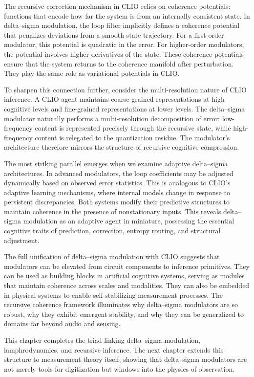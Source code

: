 The recursive correction mechanism in CLIO relies on coherence potentials: functions that encode how far the system is from an internally consistent state. In delta–sigma modulation, the loop filter implicitly defines a coherence potential that penalizes deviations from a smooth state trajectory. For a first-order modulator, this potential is quadratic in the error. For higher-order modulators, the potential involves higher derivatives of the state. These coherence potentials ensure that the system returns to the coherence manifold after perturbation. They play the same role as variational potentials in CLIO.

To sharpen this connection further, consider the multi-resolution nature of CLIO inference. A CLIO agent maintains coarse-grained representations at high cognitive levels and fine-grained representations at lower levels. The delta–sigma modulator naturally performs a multi-resolution decomposition of error: low-frequency content is represented precisely through the recursive state, while high-frequency content is relegated to the quantization residue. The modulator's architecture therefore mirrors the structure of recursive cognitive compression.

The most striking parallel emerges when we examine adaptive delta–sigma architectures. In advanced modulators, the loop coefficients may be adjusted dynamically based on observed error statistics. This is analogous to CLIO’s adaptive learning mechanisms, where internal models change in response to persistent discrepancies. Both systems modify their predictive structures to maintain coherence in the presence of nonstationary inputs. This reveals delta–sigma modulation as an adaptive agent in miniature, possessing the essential cognitive traits of prediction, correction, entropy routing, and structural adjustment.

The full unification of delta–sigma modulation with CLIO suggests that modulators can be elevated from circuit components to inference primitives. They can be used as building blocks in artificial cognitive systems, serving as modules that maintain coherence across scales and modalities. They can also be embedded in physical systems to enable self-stabilizing measurement processes. The recursive coherence framework illuminates why delta–sigma modulators are so robust, why they exhibit emergent stability, and why they can be generalized to domains far beyond audio and sensing.

This chapter completes the triad linking delta–sigma modulation, lamphrodynamics, and recursive inference. The next chapter extends this structure to measurement theory itself, showing that delta–sigma modulators are not merely tools for digitization but windows into the physics of observation.


